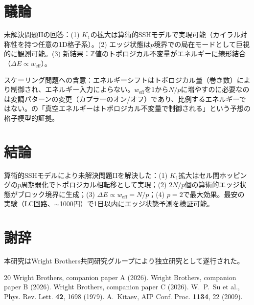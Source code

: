 \documentclass[11pt,a4paper]{article}
\begin{document}
\section{議論}

未解決問題IIの回答：(1) $K_1$の拡大は算術的SSHモデルで実現可能（カイラル対称性を持つ任意の1D格子系）。(2) エッジ状態は$p$境界での局在モードとして巨視的に観測可能。(3) 新結果：$\mathbb{Z}$値のトポロジカル不変量がエネルギーに線形結合（$\Delta E \propto w_{\mathrm{eff}}$）。

スケーリング問題への含意：エネルギーシフトはトポロジカル量（巻き数）により制御され、エネルギー入力によらない。$w_{\mathrm{eff}}$を1から$N/p$に増やすのに必要なのは変調パターンの変更（カプラーのオン/オフ）であり、比例するエネルギーではない。\cite{paper_B}の「真空エネルギーはトポロジカル不変量で制御される」という予想の格子模型的証拠。

\section{結論}

算術的SSHモデルにより未解決問題IIを解決した：(1) $K_1$拡大はセル間ホッピングの$p$周期弱化でトポロジカル相転移として実現；(2) $2N/p$個の算術的エッジ状態がブロック境界に生成；(3) $\Delta E \propto w_{\mathrm{eff}} = N/p$；(4) $p=2$で最大効果。最安の実験（LC回路、$\sim$1000円）で1日以内にエッジ状態予測を検証可能。

\section*{謝辞}
本研究はWright Brothers共同研究グループにより独立研究として遂行された。

\begin{thebibliography}{20}
 Wright Brothers, companion paper A (2026).
 Wright Brothers, companion paper B (2026).
 Wright Brothers, companion paper C (2026).
 W.~P.~Su et al., Phys. Rev. Lett. \textbf{42}, 1698 (1979).
 A.~Kitaev, AIP Conf. Proc. \textbf{1134}, 22 (2009).
\end{thebibliography}
\end{document}
